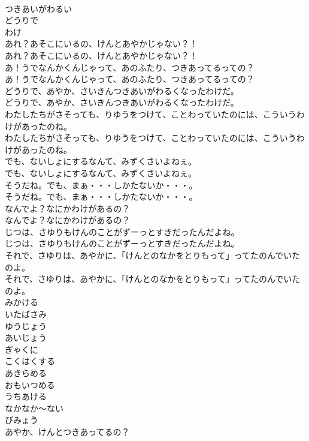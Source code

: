 \documentclass[8pt]{extreport}
\begin{document}
\begin{CJK}{UTF8}{min}
\\	つきあいがわるい
\\	どうりで
\\	わけ
\\	あれ？あそこにいるの、けんとあやかじゃない？！	
\\	あれ？あそこにいるの、けんとあやかじゃない？！ 
\\	あ！うでなんかくんじゃって、あのふたり、つきあってるっての？	
\\	あ！うでなんかくんじゃって、あのふたり、つきあってるっての？ 
\\	どうりで、あやか、さいきんつきあいがわるくなったわけだ。	
\\	どうりで、あやか、さいきんつきあいがわるくなったわけだ。 
\\	わたしたちがさそっても、りゆうをつけて、ことわっていたのには、こういうわけがあったのね。	
\\	わたしたちがさそっても、りゆうをつけて、ことわっていたのには、こういうわけがあったのね。 
\\	でも、ないしょにするなんて、みずくさいよねぇ。	
\\	でも、ないしょにするなんて、みずくさいよねぇ。 
\\	そうだね。でも、まぁ・・・しかたないか・・・。	
\\	そうだね。でも、まぁ・・・しかたないか・・・。 
\\	なんでよ？なにかわけがあるの？	
\\	なんでよ？なにかわけがあるの？ 
\\	じつは、さゆりもけんのことがずーっとすきだったんだよね。	
\\	じつは、さゆりもけんのことがずーっとすきだったんだよね。 
\\	それで、さゆりは、あやかに、「けんとのなかをとりもって」ってたのんでいたのよ。	
\\	それで、さゆりは、あやかに、「けんとのなかをとりもって」ってたのんでいたのよ。 
\\	みかける
\\	いたばさみ
\\	ゆうじょう
\\	あいじょう
\\	ぎゃくに
\\	こくはくする
\\	あきらめる
\\	おもいつめる
\\	うちあける
\\	なかなか～ない
\\	びみょう
\\	あやか、けんとつきあってるの？	

\end{CJK}
\end{document}

